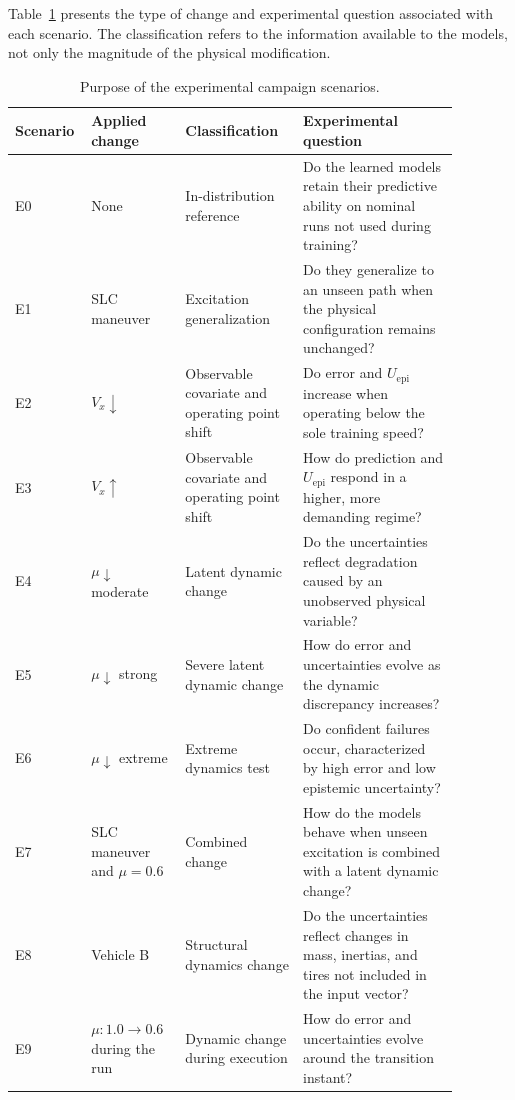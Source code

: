 \documentclass[12pt,a4paper]{report}
\begin{document}
Table~\ref{tab:experimental_campaign_purpose} presents the type of change and experimental question associated with each scenario. The classification refers to the information available to the models, not only the magnitude of the physical modification.

\begin{table}[htbp]
    \centering
    \small
    \caption{Purpose of the experimental campaign scenarios.}
    \label{tab:experimental_campaign_purpose}
    \begin{tabular}{@{}p{0.10\linewidth}p{0.20\linewidth}p{0.25\linewidth}p{0.33\linewidth}@{}}
        \toprule
        Scenario & Applied change & Classification & Experimental question \\
        \midrule
        E0
            & None
            & In-distribution reference
            & Do the learned models retain their predictive ability on nominal runs not used during training? \\
        E1
            & SLC maneuver
            & Excitation generalization
            & Do they generalize to an unseen path when the physical configuration remains unchanged? \\
        E2
            & $V_x\downarrow$
            & Observable covariate and operating point shift
            & Do error and $U_{\mathrm{epi}}$ increase when operating below the sole training speed? \\
        E3
            & $V_x\uparrow$
            & Observable covariate and operating point shift
            & How do prediction and $U_{\mathrm{epi}}$ respond in a higher, more demanding regime? \\
        E4
            & $\mu\downarrow$ moderate
            & Latent dynamic change
            & Do the uncertainties reflect degradation caused by an unobserved physical variable? \\
        E5
            & $\mu\downarrow$ strong
            & Severe latent dynamic change
            & How do error and uncertainties evolve as the dynamic discrepancy increases? \\
        E6
            & $\mu\downarrow$ extreme
            & Extreme dynamics test
            & Do confident failures occur, characterized by high error and low epistemic uncertainty? \\
        E7
            & SLC maneuver and $\mu=0.6$
            & Combined change
            & How do the models behave when unseen excitation is combined with a latent dynamic change? \\
        E8
            & Vehicle B
            & Structural dynamics change
            & Do the uncertainties reflect changes in mass, inertias, and tires not included in the input vector? \\
        E9
            & $\mu:1.0\rightarrow0.6$ during the run
            & Dynamic change during execution
            & How do error and uncertainties evolve around the transition instant? \\
        \bottomrule
    \end{tabular}
\end{table}
\end{document}

